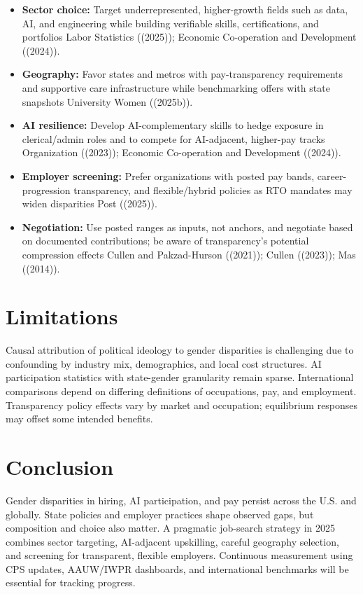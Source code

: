 \documentclass[
  letterpaper,
  DIV=11,
  numbers=noendperiod]{scrartcl}
\providecommand{\tightlist}{%
  \setlength{\itemsep}{0pt}\setlength{\parskip}{0pt}}\usepackage{longtable,booktabs,array}
\begin{document}
\begin{itemize}
\tightlist
\item
  \textbf{Sector choice:} Target underrepresented, higher-growth fields
  such as data, AI, and engineering while building verifiable skills,
  certifications, and portfolios Labor Statistics ((2025)); Economic
  Co-operation and Development ((2024)).
\item
  \textbf{Geography:} Favor states and metros with pay-transparency
  requirements and supportive care infrastructure while benchmarking
  offers with state snapshots University Women ((2025b)).
\item
  \textbf{AI resilience:} Develop AI-complementary skills to hedge
  exposure in clerical/admin roles and to compete for AI-adjacent,
  higher-pay tracks Organization ((2023)); Economic Co-operation and
  Development ((2024)).
\item
  \textbf{Employer screening:} Prefer organizations with posted pay
  bands, career-progression transparency, and flexible/hybrid policies
  as RTO mandates may widen disparities Post ((2025)).
\item
  \textbf{Negotiation:} Use posted ranges as inputs, not anchors, and
  negotiate based on documented contributions; be aware of
  transparency's potential compression effects Cullen and Pakzad-Hurson
  ((2021)); Cullen ((2023)); Mas ((2014)).
\end{itemize}

\section{Limitations}\label{limitations}

Causal attribution of political ideology to gender disparities is
challenging due to confounding by industry mix, demographics, and local
cost structures. AI participation statistics with state-gender
granularity remain sparse. International comparisons depend on differing
definitions of occupations, pay, and employment. Transparency policy
effects vary by market and occupation; equilibrium responses may offset
some intended benefits.

\section{Conclusion}\label{conclusion}

Gender disparities in hiring, AI participation, and pay persist across
the U.S. and globally. State policies and employer practices shape
observed gaps, but composition and choice also matter. A pragmatic
job-search strategy in 2025 combines sector targeting, AI-adjacent
upskilling, careful geography selection, and screening for transparent,
flexible employers. Continuous measurement using CPS updates, AAUW/IWPR
dashboards, and international benchmarks will be essential for tracking
progress.
\end{document}
